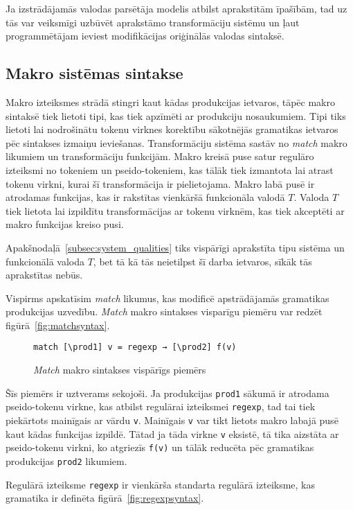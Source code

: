 Ja izstrādājamās valodas parsētāja modelis atbilst aprakstītām īpašībām, tad uz tās var veiksmīgi uzbūvēt aprakstāmo transformāciju sistēmu un ļaut programmētājam ieviest modifikācijas oriģinālās valodas sintaksē.

\subsection{Makro sistēmas sintakse}
Makro izteiksmes strādā stingri kaut kādas produkcijas ietvaros, tāpēc makro sintaksē tiek lietoti tipi, kas tiek apzīmēti ar produkciju nosaukumiem. Tipi tiks lietoti lai nodrošinātu tokenu virknes korektību sākotnējās gramatikas ietvaros pēc sintakses izmaiņu ieviešanas. Transformāciju sistēma sastāv no \emph{match} makro likumiem un transformāciju funkcijām. Makro kreisā puse satur regulāro izteiksmi no tokeniem un pseido-tokeniem, kas tālāk tiek izmantota lai atrast tokenu virkni, kurai šī transformācija ir pielietojama. Makro labā pusē ir atrodamas funkcijas, kas ir rakstītas vienkāršā funkcionāla valodā $T$. Valoda $T$ tiek lietota lai izpildītu transformācijas ar tokenu virknēm, kas tiek akceptēti ar makro funkcijas kreiso pusi.

Apakšnodaļā~\ref{subsec:system_qualities} tiks vispārīgi aprakstīta tipu sistēma un funkcionālā valoda $T$, bet tā kā tās neietilpst šī darba ietvaros, sīkāk tās aprakstītas nebūs.

Vispirms apskatīsim \textit{match} likumus, kas modificē apstrādājamās gramatikas produkcijas uzvedību. \emph{Match} makro sintakses visparīgu piemēru var redzēt figūrā~\ref{fig:matchsyntax}.
\begin{figure}[h!]
\begin{verbatim}
match [\prod1] v = regexp → [\prod2] f(v)
\end{verbatim}
\caption{\label{fid:matchsyntax}\emph{Match} makro sintakses vispārīgs piemērs}
\end{figure}

Šīs piemērs ir uztverams sekojoši. Ja produkcijas \verb|prod1| sākumā ir atrodama pseido-tokenu virkne, kas atbilst regulārai izteiksmei \verb|regexp|, tad tai tiek piekārtots mainīgais ar vārdu \verb|v|. Mainīgais \verb|v| var tikt lietots makro labajā pusē kaut kādas funkcijas izpildē. Tātad ja tāda virkne \verb|v| eksistē, tā tika aizstāta ar pseido-tokenu virkni, ko atgriezīs \verb|f(v)|  un tālāk reducēta pēc gramatikas produkcijas \verb|prod2| likumiem. 

Regulārā izteiksme \verb|regexp| ir vienkārša standarta regulārā izteiksme, kas gramatika ir definēta figūrā~\ref{fig:regexpsyntax}.

